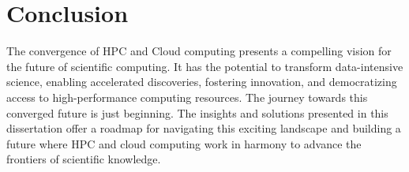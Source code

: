 \section{Conclusion}
The convergence of HPC and Cloud computing presents a compelling vision for the future of scientific computing. It has the potential to transform data-intensive science, enabling accelerated discoveries, fostering innovation, and democratizing access to high-performance computing resources.
The journey towards this converged future is just beginning. The insights and solutions presented in this dissertation offer a roadmap for navigating this exciting landscape and building a future where HPC and cloud computing work in harmony to advance the frontiers of scientific knowledge.
